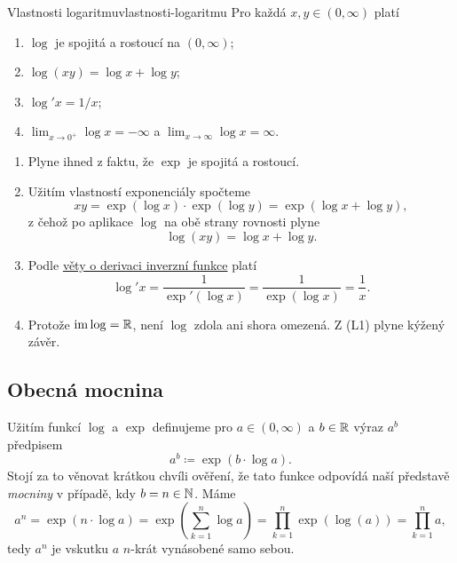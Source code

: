 \begin{proposition}{Vlastnosti logaritmu}{vlastnosti-logaritmu}
 Pro každá $x,y \in (0,\infty)$ platí
 \begin{enumerate}[label=(L\arabic*)]
  \item $\log$ je spojitá a rostoucí na $(0,\infty)$;
  \item $\log(xy) = \log x + \log y$;
  \item $\log'x = 1 / x$;
  \item $\lim_{x \to 0^{+}} \log x = -\infty$ a $\lim_{x \to \infty} \log x =
   \infty$.
 \end{enumerate}
\end{proposition}
\begin{propproof}
 \hspace*{\fill}
 \begin{enumerate}[label=(L\arabic*)]
  \item Plyne ihned z faktu, že $\exp$ je spojitá a rostoucí.
  \item Užitím vlastností exponenciály spočteme
  \[
   xy = \exp(\log x) \cdot \exp(\log y) = \exp(\log x + \log y),
  \]
  z čehož po aplikace $\log$ na obě strany rovnosti plyne
  \[
   \log(xy) = \log x + \log y.
  \]
 \item Podle \hyperref[thm:derivace-inverzni-funkce]{věty o derivaci inverzní
  funkce} platí
  \[
   \log'x = \frac{1}{\exp'(\log x)} = \frac{1}{\exp(\log x)} = \frac{1}{x}.
  \]
 \item Protože $\operatorname{im} \log = \mathbb{R}$, není $\log$ zdola ani shora omezená. Z (L1)
  plyne kýžený závěr.
 \end{enumerate}
\end{propproof}

\subsection{Obecná mocnina}
\label{ssec:obecna-mocnina}

Užitím funkcí $\log$ a $\exp$ definujeme pro $a \in (0,\infty)$ a $b \in \mathbb{R}$
výraz $a^{b}$ předpisem
\[
 a^{b} \coloneqq \exp(b \cdot \log a).
\]
Stojí za to věnovat krátkou chvíli ověření, že tato funkce odpovídá naší
představě \emph{mocniny} v případě, kdy $b = n \in \mathbb{N}$. Máme
\[
 a^{n} = \exp(n \cdot \log a) = \exp \left( \sum_{k=1}^n \log a \right) =
 \prod_{k=1}^n \exp(\log(a)) = \prod_{k=1}^n a,
\]
tedy $a^{n}$ je vskutku $a$ $n$-krát vynásobené samo sebou.

